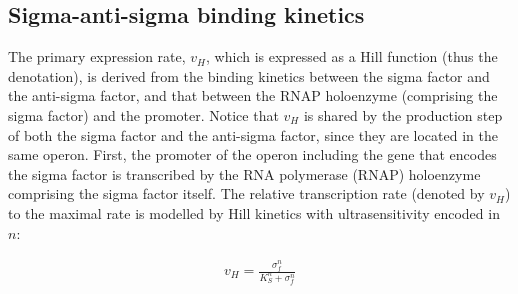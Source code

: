 


\subsection{Sigma-anti-sigma binding kinetics}

The primary expression rate, $v_H$, which is expressed as a Hill function
(thus the denotation), is derived from the binding kinetics between the
sigma factor and the anti-sigma factor,
and that between the RNAP holoenzyme (comprising the sigma factor) and the promoter.
Notice that $v_H$ is shared by the production step of both the sigma factor
and the anti-sigma factor, since they are located in the same operon.
First, the promoter of the operon including the gene that encodes the sigma factor
is transcribed by the RNA polymerase (RNAP) holoenzyme comprising 
the sigma factor itself.
The relative transcription rate (denoted by $v_H$) to the maximal rate 
is modelled by Hill kinetics with ultrasensitivity encoded in $n$:

\begin{align}
    \label{eqn:v_hill}
    v_H = \frac{\sigma_f^n}{K_S^n + \sigma_f^n}
\end{align}

